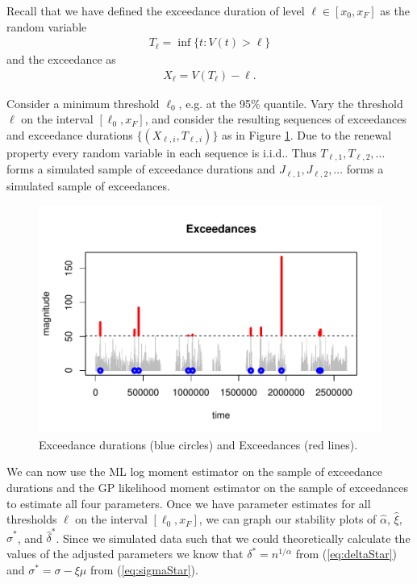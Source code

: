 \documentclass[honours,12pt]{unswthesis}
\newcommand{\1}{\mathbf 1}
\numberwithin{equation}{section}
\theoremstyle{definition}
\theoremstyle{remark}
\begin{document}
Recall that we have defined the exceedance duration of level $\ell \in [x_0,x_F]$ as
the random variable
\begin{align*}
T_\ell = \inf\{t: V(t) > \ell\}
\end{align*}
and the exceedance as 
\begin{align*}
X_\ell = V(T_\ell) - \ell.
\end{align*}

Consider a minimum threshold $\ell_0$, e.g. at the 95\% quantile.
Vary the threshold $\ell$ on the interval $[\ell_0, x_F]$, and consider
the resulting sequences of exceedances and exceedance durations 
$\{(X_{\ell,i}, T_{\ell,i})\}$ as in Figure \ref{fig:thresholdedBursty}. 
Due to the renewal property every random variable in each sequence is i.i.d.. Thus $T_{\ell,1}, T_{\ell,2}, \ldots$ forms a simulated sample of exceedance durations and $J_{\ell,1}, J_{\ell,2}, \ldots$ forms a simulated sample of exceedances.


\begin{figure}[h]
    \centering
    \includegraphics[width=\textwidth]{Figures/Exceedances.pdf}
    \caption{Exceedance durations (blue circles) and Exceedances (red lines).}\label{fig:thresholdedBursty}
\end{figure}

We can now use the ML log moment estimator on the sample of exceedance durations and the GP likelihood moment estimator on the sample of exceedances to estimate all four parameters. Once we have parameter estimates for all thresholds $\ell$ on the interval $[\ell_0, x_F]$, we can graph our stability plots of $\hat \alpha$, $\hat\xi,$ $\hat\sigma^{*}$, and $\hat\delta^{*}$. Since we simulated data such that we could theoretically calculate the values of the adjusted parameters we know that $\delta^{*}=n^{1/\alpha}$ from (\ref{eq:deltaStar}) and $\sigma^{*}=\sigma-\xi\mu$ from (\ref{eq:sigmaStar}). 
\end{document}
